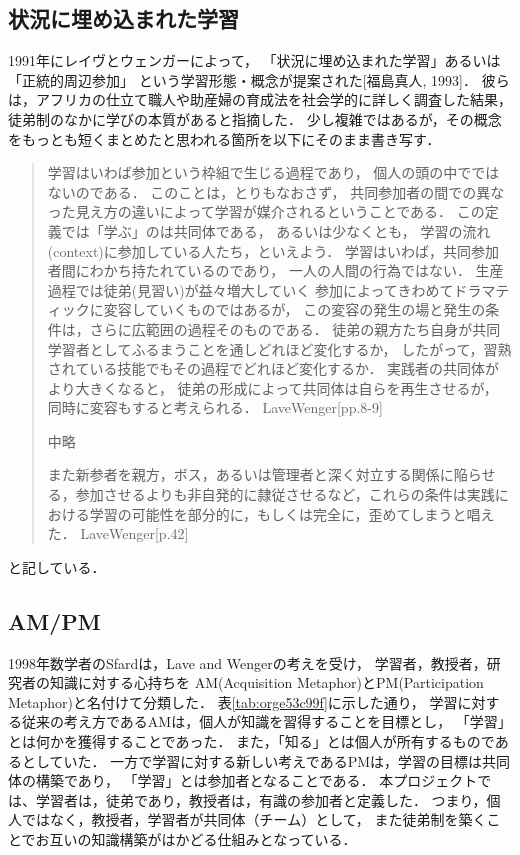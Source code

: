 \documentclass[a4,p11]{article}
\begin{document}
\subsection{状況に埋め込まれた学習}
\label{sec:org8c87fa5}
1991年にレイヴとウェンガーによって，
  「状況に埋め込まれた学習」あるいは「正統的周辺参加」
  という学習形態・概念が提案された[福島真人, 1993]．
  彼らは，アフリカの仕立て職人や助産婦の育成法を社会学的に詳しく調査した結果，
  徒弟制のなかに学びの本質があると指摘した．
少し複雑ではあるが，その概念をもっとも短くまとめたと思われる箇所を以下にそのまま書き写す．
\begin{quote}
学習はいわば参加という枠組で生じる過程であり，
個人の頭の中でではないのである．
このことは，とりもなおさず，
共同参加者の間での異なった見え方の違いによって学習が媒介されるということである．
この定義では「学ぶ」のは共同体である，
あるいは少なくとも，
学習の流れ(context)に参加している人たち，といえよう．
学習はいわば，共同参加者間にわかち持たれているのであり，
一人の人間の行為ではない．
生産過程では徒弟(見習い)が益々増大していく
参加によってきわめてドラマティックに変容していくものではあるが，
この変容の発生の場と発生の条件は，さらに広範囲の過程そのものである．
徒弟の親方たち自身が共同学習者としてふるまうことを通しどれほど変化するか，
したがって，習熟されている技能でもその過程でどれほど変化するか．
実践者の共同体がより大きくなると，
徒弟の形成によって共同体は自らを再生させるが，
同時に変容もすると考えられる．
LaveWenger[pp.8-9]

中略

また新参者を親方，ボス，あるいは管理者と深く対立する関係に陥らせる，参加させるよりも非自発的に隷従させるなど，これらの条件は実践における学習の可能性を部分的に，もしくは完全に，歪めてしまうと唱えた．
 LaveWenger[p.42]
\end{quote}
と記している．


\subsection{AM/PM}
\label{sec:orga2b152a}
1998年数学者のSfardは，Lave and Wengerの考えを受け，
学習者，教授者，研究者の知識に対する心持ちを
AM(Acquisition Metaphor)とPM(Participation Metaphor)と名付けて分類した．
表\ref{tab:orge53c99f}に示した通り，
学習に対する従来の考え方であるAMは，個人が知識を習得することを目標とし，
「学習」とは何かを獲得することであった．
また，「知る」とは個人が所有するものであるとしていた．
一方で学習に対する新しい考えであるPMは，学習の目標は共同体の構築であり，
「学習」とは参加者となることである．
本プロジェクトでは、学習者は，徒弟であり，教授者は，有識の参加者と定義した．
つまり，個人ではなく，教授者，学習者が共同体（チーム）として，
また徒弟制を築くことでお互いの知識構築がはかどる仕組みとなっている．
\end{document}

